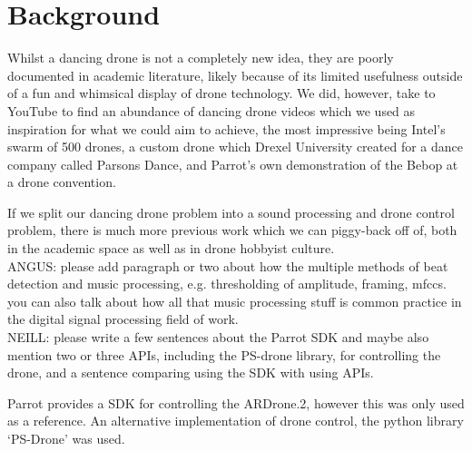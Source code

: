 \section{Background}

Whilst a dancing drone is not a completely new idea, they are poorly documented in academic literature, likely because of its limited usefulness outside of a fun and whimsical display of drone technology. We did, however, take to YouTube to find an abundance of dancing drone videos which we used as inspiration for what we could aim to achieve, the most impressive being Intel's swarm of 500 drones, a custom drone which Drexel University created for a dance company called Parsons Dance, and Parrot's own demonstration of the Bebop at a drone convention.


If we split our dancing drone problem into a sound processing and drone control problem, there is much more previous work which we can piggy-back off of, both in the academic space as well as in drone hobbyist culture.\\

ANGUS: please add paragraph or two about how the multiple methods of beat detection and music processing, e.g. thresholding of amplitude, framing, mfccs. you can also talk about how all that music processing stuff is common practice in the digital signal processing field of work.\\

NEILL: please write a few sentences about the Parrot SDK and maybe also mention two or three APIs, including the PS-drone library, for controlling the drone, and a sentence comparing using the SDK with using APIs.

Parrot provides a SDK for controlling the ARDrone.2, however this was only used as a reference. An alternative
implementation of drone control, the python library `PS-Drone' was used.
